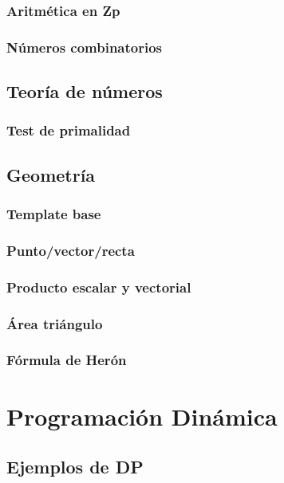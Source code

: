     \subsubsection{Aritmética en Zp}
    \subsubsection{Números combinatorios}
\subsection{Teoría de números}
\subsubsection{Test de primalidad}
\subsection{Geometría}
    \subsubsection{Template base}
    \subsubsection{Punto/vector/recta}
    \subsubsection{Producto escalar y vectorial}
    \subsubsection{Área triángulo}
    \subsubsection{Fórmula de Herón}
    
\section{Programación Dinámica}
\subsection{Ejemplos de DP}
